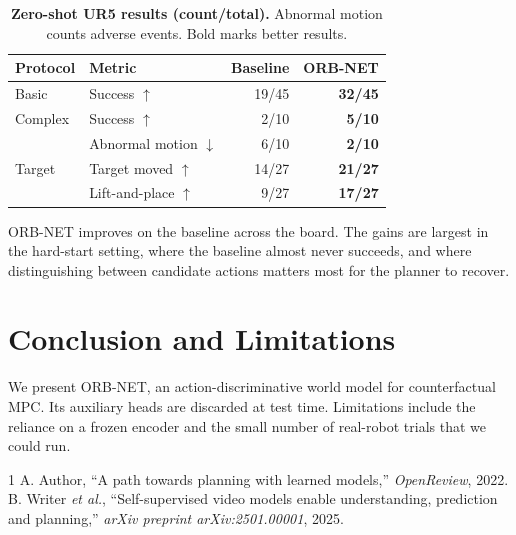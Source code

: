 \documentclass[conference]{IEEEtran}
\begin{document}
\begin{table}[t]
\caption{\textbf{Zero-shot UR5 results (count/total).} Abnormal motion counts adverse events. Bold marks better results.}
\label{tab:franka}
\centering\footnotesize
\begin{tabular}{llrr}
\toprule
\rowcolor{gray!15}Protocol & Metric & Baseline & \textbf{ORB-NET}\\
\midrule
Basic & Success $\uparrow$ & 19/45 & \textbf{32/45}\\
\midrule
Complex & Success $\uparrow$ & 2/10 & \textbf{5/10}\\
 & Abnormal motion $\downarrow$ & 6/10 & \textbf{2/10}\\
\midrule
Target & Target moved $\uparrow$ & 14/27 & \textbf{21/27}\\
 & Lift-and-place $\uparrow$ & 9/27 & \textbf{17/27}\\
\bottomrule
\end{tabular}
\end{table}
ORB-NET improves on the baseline across the board. The gains are largest in the hard-start setting, where the baseline almost never succeeds, and where distinguishing between candidate actions matters most for the planner to recover.
\section{Conclusion and Limitations}
We present ORB-NET, an action-discriminative world model for counterfactual MPC. Its auxiliary heads are discarded at test time. Limitations include the reliance on a frozen encoder and the small number of real-robot trials that we could run.
\begin{thebibliography}{1}
 A. Author, ``A path towards planning with learned models,'' \emph{OpenReview}, 2022.
 B. Writer \emph{et al.}, ``Self-supervised video models enable understanding, prediction and planning,'' \emph{arXiv preprint arXiv:2501.00001}, 2025.
\end{thebibliography}
\end{document}
